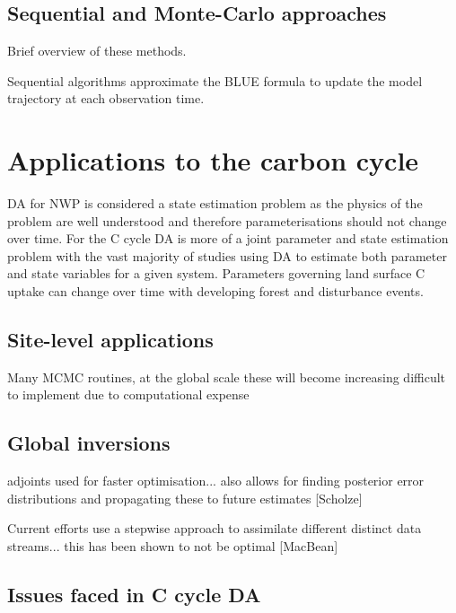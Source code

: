 \documentclass[12pt]{article}
\begin{document}
\subsection{Sequential and Monte-Carlo approaches}

Brief overview of these methods.

Sequential algorithms approximate the BLUE formula to update the model trajectory at each observation time. 

\section{Applications to the carbon cycle}

DA for NWP is considered a state estimation problem as the physics of the problem are well understood and therefore parameterisations should not change over time. For the C cycle DA is more of a joint parameter and state estimation problem with the vast majority of studies using DA to estimate both parameter and state variables for a given system. Parameters governing land surface C uptake can change over time with developing forest and disturbance events.  

\subsection{Site-level applications}

Many MCMC routines, at the global scale these will become increasing difficult to implement due to computational expense

\subsection{Global inversions}

adjoints used for faster optimisation... also allows for finding posterior error distributions and propagating these to future estimates [Scholze]

Current efforts use a stepwise approach to assimilate different distinct data streams... this has been shown to not be optimal [MacBean]

\subsection{Issues faced in C cycle DA}
\end{document}
